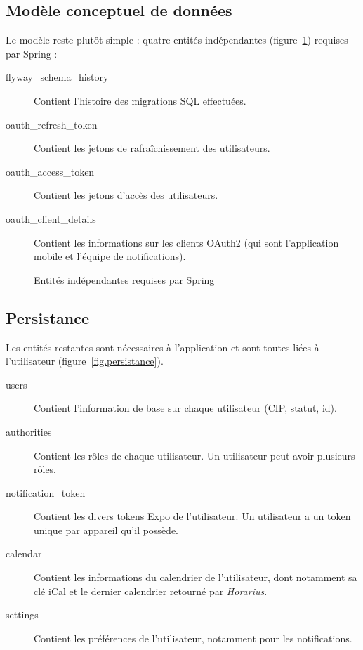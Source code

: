     \subsection{Modèle conceptuel de données}
    \noindent Le modèle reste plutôt simple : quatre entités indépendantes (figure~\ref{fig.entitesRequises}) requises par Spring :
    \begin{description}
        \item[flyway\_schema\_history] Contient l'histoire des migrations SQL effectuées.
        \item[oauth\_refresh\_token] Contient les jetons de rafraîchissement des utilisateurs.
        \item[oauth\_access\_token] Contient les jetons d'accès des utilisateurs.
        \item[oauth\_client\_details] Contient les informations sur les clients OAuth2 (qui sont l'application mobile et l'équipe de notifications).
    \end{description}
    
    \begin{figure}[p] \centering
        
        \caption{Entités indépendantes requises par Spring}
        \label{fig.entitesRequises}
    \end{figure}
    
    \subsection{Persistance}
    \noindent Les entités restantes sont nécessaires à l'application et sont toutes liées à l'utilisateur (figure~\ref{fig.persistance}).
    \begin{description}
        \item[users] Contient l'information de base sur chaque utilisateur (CIP, statut, id).
        \item[authorities] Contient les rôles de chaque utilisateur. Un utilisateur peut avoir plusieurs rôles.
        \item[notification\_token] Contient les divers tokens Expo de l'utilisateur. Un utilisateur a un token unique par appareil qu'il possède.
        \item[calendar] Contient les informations du calendrier de l'utilisateur, dont notamment sa clé iCal et le dernier calendrier retourné par \emph{Horarius}.
        \item[settings] Contient les préférences de l'utilisateur, notamment pour les notifications.
    \end{description}

